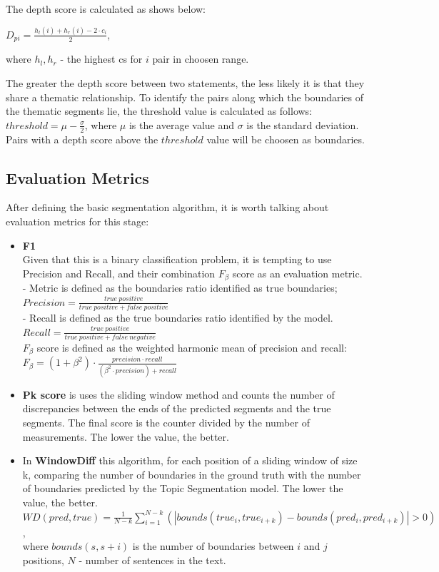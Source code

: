 \documentclass[PMI,VKR]{HSEUniversity}
\begin{document}
The depth score is calculated as shows below: 
\begin{center}
    $D_{pi} = \frac{h_{l}(i) + h_{r}(i) - 2 \cdot c_{i}}{2}$,
\end{center}
where $h_{l}, h_{r}$ - the highest cs for $i$ pair in choosen range.

The greater the depth score between two statements, the less likely it is that they share a thematic relationship. 
To identify the pairs along which the boundaries of the thematic segments lie, the threshold value is calculated as follows: $threshold = \mu - \frac{\sigma}{2}$, where $\mu$ is the average value and $\sigma$ is the standard deviation. Pairs with a depth score above the $threshold$ value will be choosen as boundaries.

\subsection{Evaluation Metrics}

After defining the basic segmentation algorithm, it is worth talking about evaluation metrics for this stage:
\begin{itemize}
    \item \textbf{F1}\\
    Given that this is a binary classification problem, it is tempting to use Precision and Recall, and their combination $F_{\beta}$ score as an evaluation metric. \\ 
     - Metric is defined as the boundaries ratio identified as true boundaries; \\
       $Precision = \frac{true \: positive}{true \: positive + false \: positive}$ \\
     - Recall is defined as the true boundaries ratio identified by the model. \\
       $Recall = \frac{true \: positive}{true \: positive + false \: negative}$ \\
    $F_{\beta}$ score is defined as the weighted harmonic mean of precision and recall: \\
    $F_{\beta} = (1 + \beta^{2}) \cdot \frac{precision \cdot recall}{(\beta^{2} \cdot precision) + recall}$
    \item \textbf{Pk score} \cite{pk:1999} is uses the sliding window method and counts the number of discrepancies between the ends of the predicted segments and the true segments. The final score is the counter divided by the number of measurements. The lower the value, the better.
    \item In \textbf{WindowDiff} \cite{wd:2002} this algorithm, for each position of a sliding window of size k, comparing the number of boundaries in the ground truth with the number of boundaries predicted by the Topic Segmentation model. The lower the value, the better.\\
    $WD(pred, true) = \frac{1}{N - k}\sum_{i = 1}^{N - k}(\left\lvert bounds(true_{i}, true_{i + k}) - bounds(pred_{i}, pred_{i + k}) \right\rvert > 0)$, \\ 
    where $bounds(s, s + i)$ is the number of boundaries between $i$ and $j$ positions, $N$ - number of sentences in the text.
\end{itemize} 
\end{document}

